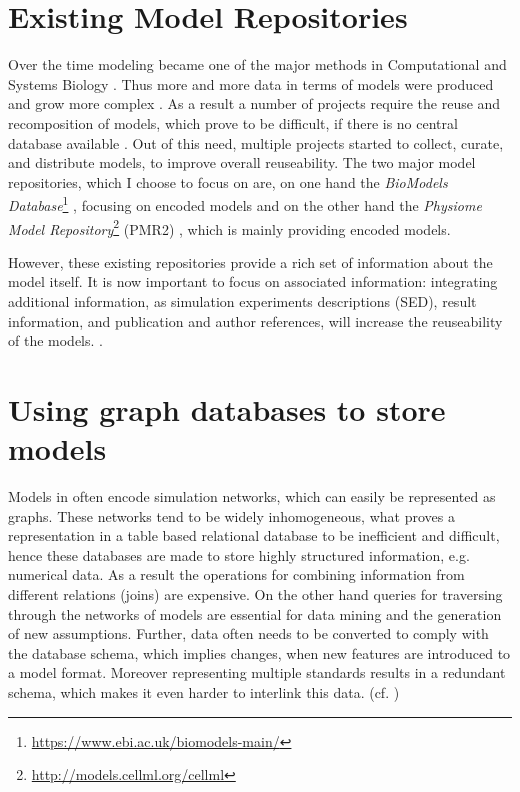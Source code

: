 \section{Existing Model Repositories}
\label{sec:background:modelrepo}
Over the time modeling became one of the major methods in Computational and Systems Biology \citep{Finkelstein2004}. Thus more and more data in terms of models were produced and grow more complex \citep{Henkel2010}. As a result a number of projects require the reuse and recomposition of models, which prove to be difficult, if there is no central database available \citep{Waltemath2013}.
Out of this need, multiple projects started to collect, curate, and distribute models, to improve overall reuseability.
The two major model repositories, which I choose to focus on are, on one hand the \emph{BioModels Database}\footnote{\url{https://www.ebi.ac.uk/biomodels-main/}} \citep{Li2010}, focusing on \sbml encoded models and on the other hand the \emph{Physiome Model Repository}\footnote{\url{http://models.cellml.org/cellml}} (PMR2) \citep{Yu2011}, which is mainly providing \cellml encoded models.

However, these existing repositories provide a rich set of information about the model itself. It is now important to focus on associated information: integrating additional information, as simulation experiments descriptions (SED), result information, and publication and author references, will increase the reuseability of the models. \citep{Waltemath2013,Henkel2012}.

\section{Using graph databases to store models}
\label{sec:backgroung:graph-db}
Models in \sysbio often encode simulation networks, which can easily be represented as graphs. These networks tend to be widely inhomogeneous, what proves a representation in a table based relational database to be inefficient and difficult, hence these databases are made to store highly structured information, e.g. numerical data.
As a result the operations for combining information from different relations (joins) are expensive. On the other hand queries for traversing through the networks of models are essential for data mining and the generation of new assumptions.
Further, data often needs to be converted to comply with the database schema, which implies changes, when new features are introduced to a model format. Moreover representing multiple standards results in a redundant schema, which makes it even harder to interlink this data. (cf. \citealt{Lysenko2016})

